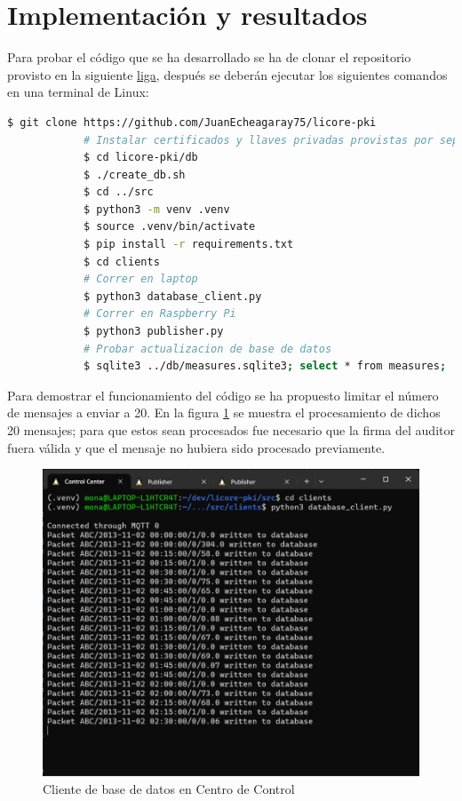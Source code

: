\documentclass{article}
\begin{document}
    \section{Implementación y resultados} \label{sec:implementation}

        Para probar el código que se ha desarrollado se ha de clonar el repositorio provisto en la siguiente \href{https://github.com/JuanEcheagaray75/licore-pki}{liga}, después se deberán ejecutar los siguientes comandos en una terminal de Linux:
        \begin{lstlisting}[language=bash]
            $ git clone https://github.com/JuanEcheagaray75/licore-pki
            # Instalar certificados y llaves privadas provistas por separado
            $ cd licore-pki/db
            $ ./create_db.sh
            $ cd ../src
            $ python3 -m venv .venv
            $ source .venv/bin/activate
            $ pip install -r requirements.txt
            $ cd clients
            # Correr en laptop
            $ python3 database_client.py
            # Correr en Raspberry Pi
            $ python3 publisher.py
            # Probar actualizacion de base de datos
            $ sqlite3 ../db/measures.sqlite3; select * from measures;
        \end{lstlisting}

        Para demostrar el funcionamiento del código se ha propuesto limitar el número de mensajes a enviar a 20. En la figura \ref{fig:db_client} se muestra el procesamiento de dichos 20 mensajes; para que estos sean procesados fue necesario que la firma del auditor fuera válida y que el mensaje no hubiera sido procesado previamente.
        \begin{figure}[!htbp]
            \centering
            \includegraphics[scale=0.5]{database_client.png}
            \caption{Cliente de base de datos en Centro de Control}
            \label{fig:db_client}
        \end{figure}
\end{document}
